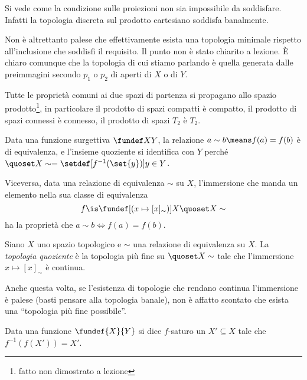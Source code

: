 \begin{oss}
	Si vede come la condizione sulle proiezioni non sia impossibile da soddisfare. Infatti la topologia discreta sul prodotto cartesiano soddisfa banalmente.

	Non è altrettanto palese che effettivamente esista una topologia minimale rispetto all'inclusione che soddisfi il requisito. Il punto non è stato chiarito a lezione. È chiaro comunque che la topologia di cui stiamo parlando è quella generata dalle preimmagini secondo $p_1$ o $p_2$ di aperti di $X$ o di $Y$.
\end{oss}

\begin{oss}
	Tutte le proprietà comuni ai due spazi di partenza si propagano allo spazio prodotto\footnote{fatto non dimostrato a lezione}, in particolare il prodotto di spazi compatti è compatto, il prodotto di spazi connessi è connesso, il prodotto di spazi $T_2$ è $T_2$.
\end{oss}

\begin{oss}
	Data una funzione surgettiva $\fundef XY$, la relazione $a\sim b\means f(a)=f(b)$ è di equivalenza, e l'insieme quoziente si identifica con $Y$ perché $\quoset X\sim=\setdef[f^{-1}(\set{y})]{y\in Y}$.
	
	Viceversa, data una relazione di equivalenza $\sim$ su $X$, l'immersione che manda un elemento nella sua classe di equivalenza
	\[f\is\fundef[{(x\mapsto [x]_\sim)}]X{\quoset X\sim}\]
	ha la proprietà che $a\sim b\iff f(a)=f(b)$.
\end{oss}

\begin{defn}
	Siano $X$ uno spazio topologico e $\sim$ una relazione di equivalenza su $X$.
	La \emph{topologia quoziente} è la topologia più fine su $\quoset X\sim$ tale che l'immersione $x\mapsto[x]_\sim$ è continua.
\end{defn}

\begin{oss}
	Anche questa volta, se l'esistenza di topologie che rendano continua l'immersione è palese (basti pensare alla topologia banale), non è affatto scontato che esista una ``topologia più fine possibile''.
\end{oss}

\begin{defn}
	Data una funzione $\fundef{X}{Y}$ si dice $f$-saturo un $X'\subseteq X$ tale che $f^{-1}(f(X'))=X'$.
\end{defn}

